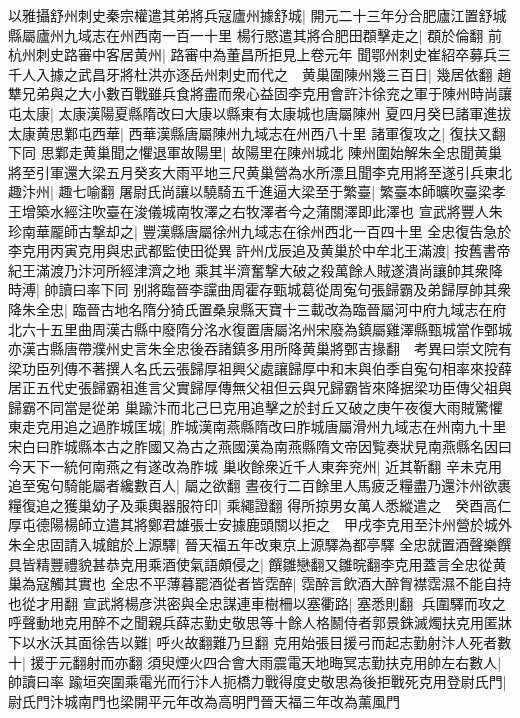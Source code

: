 以雅攝舒州刺史秦宗權遣其弟將兵寇廬州據舒城|{
	開元二十三年分合肥廬江置舒城縣屬廬州九域志在州西南一百一十里}
楊行愍遣其將合肥田頵擊走之|{
	頵於倫翻}
前杭州刺史路審中客居黄州|{
	路審中為董昌所拒見上卷元年}
聞鄂州刺史崔紹卒募兵三千人入據之武昌牙將杜洪亦逐岳州刺史而代之　黄巢圍陳州幾三百日|{
	幾居依翻}
趙犨兄弟與之大小數百戰雖兵食將盡而衆心益固李克用會許汴徐兖之軍于陳州時尚讓屯太康|{
	太康漢陽夏縣隋改曰大康以縣東有太康城也唐屬陳州}
夏四月癸巳諸軍進拔太康黄思鄴屯西華|{
	西華漢縣唐屬陳州九域志在州西八十里}
諸軍復攻之|{
	復扶又翻下同}
思鄴走黄巢聞之懼退軍故陽里|{
	故陽里在陳州城北}
陳州圍始解朱全忠聞黄巢將至引軍還大梁五月癸亥大雨平地三尺黄巢營為水所漂且聞李克用將至遂引兵東北趣汴州|{
	趣七喻翻}
屠尉氏尚讓以驍騎五千進逼大梁至于繁臺|{
	繁臺本師曠吹臺梁孝王增築水經注吹臺在浚儀城南牧澤之右牧澤者今之蒲關澤即此澤也}
宣武將豐人朱珍南華龎師古撃却之|{
	豐漢縣唐屬徐州九域志在徐州西北一百四十里}
全忠復告急於李克用丙寅克用與忠武都監使田從異許州戊辰追及黄巢於中牟北王滿渡|{
	按舊書帝紀王滿渡乃汴河所經津濟之地}
乘其半濟奮撃大破之殺萬餘人賊遂潰尚讓帥其衆降時溥|{
	帥讀曰率下同}
别將臨晉李讜曲周霍存甄城葛從周寃句張歸霸及弟歸厚帥其衆降朱全忠|{
	臨晉古地名隋分猗氏置桑泉縣天寶十三載改為臨晉屬河中府九域志在府北六十五里曲周漢古縣中廢隋分洺水復置唐屬洺州宋廢為鎮屬雞澤縣甄城當作鄄城亦漢古縣唐帶濮州史言朱全忠後吞諸鎮多用所降黄巢將鄄吉掾翻　考異曰崇文院有梁功臣列傳不著撰人名氏云張歸厚祖興父處讓歸厚中和末與伯季自寃句相率來投薛居正五代史張歸霸祖進言父實歸厚傳無父祖但云與兄歸霸皆來降据梁功臣傳父祖與歸霸不同當是從弟}
巢踰汴而北己巳克用追擊之於封丘又破之庚午夜復大雨賊驚懼東走克用追之過胙城匡城|{
	胙城漢南燕縣隋改曰胙城唐屬滑州九域志在州南九十里宋白曰胙城縣本古之胙國又為古之燕國漢為南燕縣隋文帝因覧奏狀見南燕縣名因曰今天下一統何南燕之有遂改為胙城}
巢收餘衆近千人東奔兖州|{
	近其靳翻}
辛未克用追至寃句騎能屬者纔數百人|{
	屬之欲翻}
晝夜行二百餘里人馬疲乏糧盡乃還汴州欲裹糧復追之獲巢幼子及乘輿器服符印|{
	乘繩證翻}
得所掠男女萬人悉縱遣之　癸酉高仁厚屯德陽楊師立遣其將鄭君雄張士安據鹿頭關以拒之　甲戌李克用至汴州營於城外朱全忠固請入城館於上源驛|{
	晉天福五年改東京上源驛為都亭驛}
全忠就置酒聲樂饌具皆精豐禮貌甚恭克用乘酒使氣語頗侵之|{
	饌雛戀翻又雛晥翻李克用蓋言全忠從黄巢為寇觸其實也}
全忠不平薄暮罷酒從者皆霑醉|{
	霑醉言飲酒大醉胷襟霑濕不能自持也從才用翻}
宣武將楊彦洪密與全忠謀連車樹柵以塞衢路|{
	塞悉則翻}
兵圍驛而攻之呼聲動地克用醉不之聞親兵薛志勤史敬思等十餘人格鬭侍者郭景銖滅燭扶克用匿牀下以水沃其面徐告以難|{
	呼火故翻難乃旦翻}
克用始張目援弓而起志勤射汴人死者數十|{
	援于元翻射而亦翻}
須臾煙火四合會大雨震電天地晦冥志勤扶克用帥左右數人|{
	帥讀曰率}
踰垣突圍乘電光而行汴人扼橋力戰得度史敬思為後拒戰死克用登尉氏門|{
	尉氏門汴城南門也梁開平元年改為高明門晉天福三年改為薰風門}
